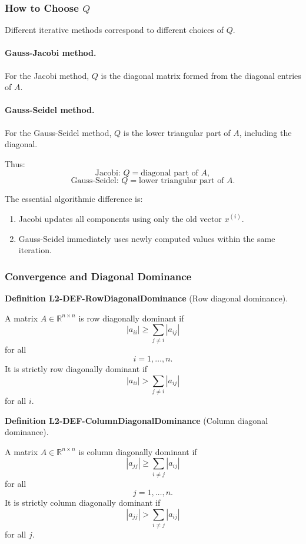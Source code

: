 \documentclass[10pt, letterpaper]{article}
\newcommand{\R}{\mathbb{R}}
\newcommand{\CustomHeading}[3]{%
  \par\medskip\noindent%
  \textbf{#1 #2} \textnormal{(#3)}.\enskip%
}
\newenvironment{DEF}[2]{\CustomHeading{Definition}{#1}{#2}}{}
\begin{document}
\subsubsection{How to Choose \(Q\)}

Different iterative methods correspond to different choices of \(Q\).

\paragraph{Gauss-Jacobi method.}
For the Jacobi method, \(Q\) is the diagonal matrix formed from the diagonal entries of \(A\).

\paragraph{Gauss-Seidel method.}
For the Gauss-Seidel method, \(Q\) is the lower triangular part of \(A\), including the diagonal.

Thus:
\[
\text{Jacobi: } Q=\text{diagonal part of }A,
\]
\[
\text{Gauss-Seidel: } Q=\text{lower triangular part of }A.
\]

The essential algorithmic difference is:
\begin{enumerate}
    \item Jacobi updates all components using only the old vector \(x^{(i)}\).
    \item Gauss-Seidel immediately uses newly computed values within the same iteration.
\end{enumerate}

\subsubsection{Convergence and Diagonal Dominance}

\begin{DEF}{L2-DEF-RowDiagonalDominance}{Row diagonal dominance}
A matrix \(A\in\R^{n\times n}\) is row diagonally dominant if
\[
|a_{ii}|
\geq
\sum_{j\neq i}|a_{ij}|
\]
for all
\[
i=1,\dots,n.
\]
It is strictly row diagonally dominant if
\[
|a_{ii}|
>
\sum_{j\neq i}|a_{ij}|
\]
for all \(i\).
\end{DEF}

\begin{DEF}{L2-DEF-ColumnDiagonalDominance}{Column diagonal dominance}
A matrix \(A\in\R^{n\times n}\) is column diagonally dominant if
\[
|a_{jj}|
\geq
\sum_{i\neq j}|a_{ij}|
\]
for all
\[
j=1,\dots,n.
\]
It is strictly column diagonally dominant if
\[
|a_{jj}|
>
\sum_{i\neq j}|a_{ij}|
\]
for all \(j\).
\end{DEF}
\end{document}
